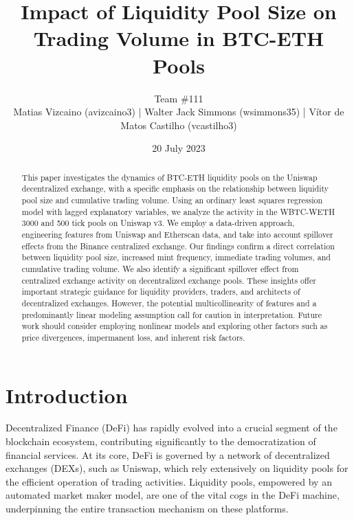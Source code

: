 \documentclass{article}
\makeatletter
\renewcommand{\maketitle}{\bgroup\setlength{\parindent}{0pt}
\begin{center} %
  \Large\@title
  \newline
  \footnotesize\@author
\end{center}
\begin{flushright}
  \@date
\end{flushright}
\egroup}
\makeatother
\begin{document}
\title{Impact of Liquidity Pool Size on Trading Volume in BTC-ETH Pools}
\author{
  Team \#111 \\
   \scriptsize Matias Vizcaino (avizcaino3) | Walter Jack Simmons (wsimmons35) | Vítor de Matos Castilho (vcastilho3)
}
\date{20 July 2023}
\maketitle

\noindent


\begin{abstract}
  This paper investigates the dynamics of BTC-ETH liquidity pools on the Uniswap decentralized exchange, with a specific emphasis on the relationship between liquidity pool size and cumulative trading volume. Using an ordinary least squares regression model with lagged explanatory variables, we analyze the activity in the WBTC-WETH 3000 and 500 tick pools on Uniswap v3. We employ a data-driven approach, engineering features from Uniswap and Etherscan data, and take into account spillover effects from the Binance centralized exchange. Our findings confirm a direct correlation between liquidity pool size, increased mint frequency, immediate trading volumes, and cumulative trading volume. We also identify a significant spillover effect from centralized exchange activity on decentralized exchange pools. These insights offer important strategic guidance for liquidity providers, traders, and architects of decentralized exchanges. However, the potential multicollinearity of features and a predominantly linear modeling assumption call for caution in interpretation. Future work should consider employing nonlinear models and exploring other factors such as price divergences, impermanent loss, and inherent risk factors.
\end{abstract}
  
\section*{\textbf{Introduction}}

Decentralized Finance (DeFi) has rapidly evolved into a crucial segment of the blockchain ecosystem, contributing significantly to the democratization of financial services. At its core, DeFi is governed by a network of decentralized exchanges (DEXs), such as Uniswap, which rely extensively on liquidity pools for the efficient operation of trading activities. Liquidity pools, empowered by an automated market maker model, are one of the vital cogs in the DeFi machine, underpinning the entire transaction mechanism on these platforms\cite{Miori2022,Aigner2021,Xu2023}.
\end{document}
